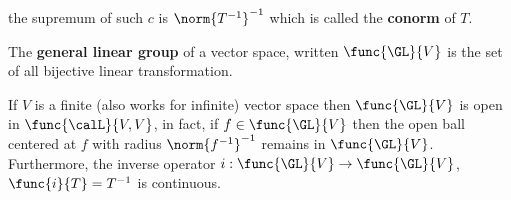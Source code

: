 \begin{remark}
    the supremum of such \(c\) is \(\norm{T^{-1}}^{-1}\) which is called the \textbf{conorm} of \(T\).
\end{remark}

\begin{definition}
    The \textbf{general linear group} of a vector space, written \(\func{\GL}{V}\) is the set of all bijective linear transformation.
\end{definition}

\begin{proposition}
    If \(V\) is a finite (also works for infinite) vector space then \(\func{\GL}{V}\) is open in \(\func{\calL}{V,V}\), in fact, if \(f \in \func{\GL}{V}\) then the open ball centered at \(f\) with radius \(\norm{f^{-1}}^{-1}\) remains in \(\func{\GL}{V}\). Furthermore, the inverse operator \(i : \func{\GL}{V} \to \func{\GL}{V}\), \(\func{i}{T} = T^{-1}\) is continuous.
\end{proposition}

